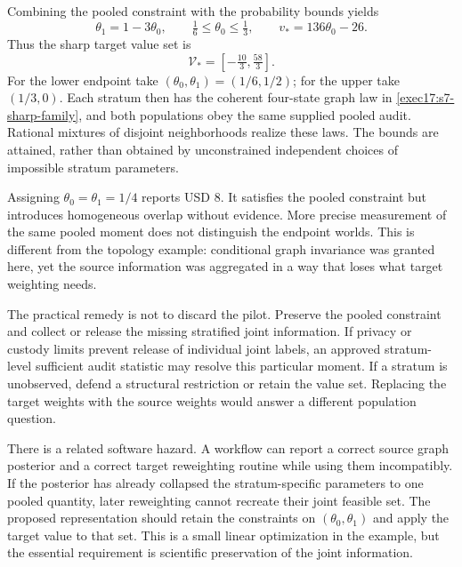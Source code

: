 Combining the pooled constraint with the probability bounds yields
\begin{equation}
 \theta_1=1-3\theta_0,\qquad
 \tfrac16\leq\theta_0\leq\tfrac13,
 \qquad v_*=136\theta_0-26.
 \label{exec17:s7-pooled-reduction}
\end{equation}
Thus the sharp target value set is
\begin{equation}
 \mathcal V_*=[-\tfrac{10}{3},\tfrac{58}{3}].
 \label{exec17:s7-pooled-set}
\end{equation}
For the lower endpoint take $(\theta_0,\theta_1)=(1/6,1/2)$; for the upper
take $(1/3,0)$. Each stratum then has the coherent four-state graph law in
\eqref{exec17:s7-sharp-family}, and both populations obey the same supplied
pooled audit. Rational mixtures of disjoint neighborhoods realize these laws.
The bounds are attained, rather than obtained by unconstrained independent
choices of impossible stratum parameters.~\citep{exec17_s7_math}

Assigning $\theta_0=\theta_1=1/4$ reports USD 8. It satisfies the pooled
constraint but introduces homogeneous overlap without evidence. More precise
measurement of the same pooled moment does not distinguish the endpoint
worlds. This is different from the topology example: conditional graph
invariance was granted here, yet the source information was aggregated in a
way that loses what target weighting needs.

The practical remedy is not to discard the pilot. Preserve the pooled
constraint and collect or release the missing stratified joint information.
If privacy or custody limits prevent release of individual joint labels, an
approved stratum-level sufficient audit statistic may resolve this particular
moment. If a stratum is unobserved, defend a structural restriction or retain
the value set. Replacing the target weights with the source weights would
answer a different population question.

There is a related software hazard. A workflow can report a correct source
graph posterior and a correct target reweighting routine while using them
incompatibly. If the posterior has already collapsed the stratum-specific
parameters to one pooled quantity, later reweighting cannot recreate their
joint feasible set. The proposed representation should retain the constraints
on $(\theta_0,\theta_1)$ and apply the target value to that set. This is a
small linear optimization in the example, but the essential requirement is
scientific preservation of the joint information.

